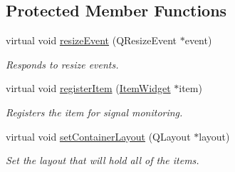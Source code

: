 \subsection*{Protected Member Functions}
\begin{DoxyCompactItemize}
\item 
virtual void \hyperlink{class_u_i_1_1_item_collection_widget_a7bae5ecd7edcfbf4378ca02fe9f14e74}{resize\-Event} (Q\-Resize\-Event $\ast$event)
\begin{DoxyCompactList}\small\item\em Responds to resize events. \end{DoxyCompactList}\item 
virtual void \hyperlink{class_u_i_1_1_item_collection_widget_acfaee6f188e44f7821e234978a8f310c}{register\-Item} (\hyperlink{class_u_i_1_1_item_widget}{Item\-Widget} $\ast$item)
\begin{DoxyCompactList}\small\item\em Registers the item for signal monitoring. \end{DoxyCompactList}\item 
virtual void \hyperlink{class_u_i_1_1_item_collection_widget_a210862ae68d069458b3d17a6c5e1dd5c}{set\-Container\-Layout} (Q\-Layout $\ast$layout)
\begin{DoxyCompactList}\small\item\em Set the layout that will hold all of the items. \end{DoxyCompactList}\end{DoxyCompactItemize}
